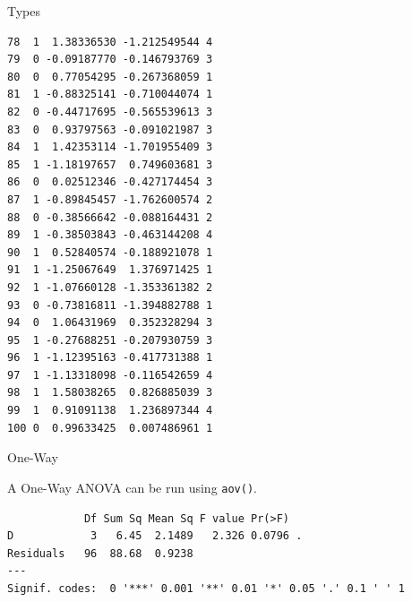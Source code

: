 \begin{frame}[fragile]{Types}
\begin{verbatim}
78  1  1.38336530 -1.212549544 4
79  0 -0.09187770 -0.146793769 3
80  0  0.77054295 -0.267368059 1
81  1 -0.88325141 -0.710044074 1
82  0 -0.44717695 -0.565539613 3
83  0  0.93797563 -0.091021987 3
84  1  1.42353114 -1.701955409 3
85  1 -1.18197657  0.749603681 3
86  0  0.02512346 -0.427174454 3
87  1 -0.89845457 -1.762600574 2
88  0 -0.38566642 -0.088164431 2
89  1 -0.38503843 -0.463144208 4
90  1  0.52840574 -0.188921078 1
91  1 -1.25067649  1.376971425 1
92  1 -1.07660128 -1.353361382 2
93  0 -0.73816811 -1.394882788 1
94  0  1.06431969  0.352328294 3
95  1 -0.27688251 -0.207930759 3
96  1 -1.12395163 -0.417731388 1
97  1 -1.13318098 -0.116542659 4
98  1  1.58038265  0.826885039 3
99  1  0.91091138  1.236897344 4
100 0  0.99633425  0.007486961 1
\end{verbatim}

\end{frame}

\begin{frame}[fragile]{One-Way}

A One-Way ANOVA can be run using \texttt{aov()}.

\begin{Shaded}
\begin{Highlighting}[]
\StringTok{ }\OperatorTok{~}\StringTok{ }
\end{Highlighting}
\end{Shaded}

\begin{verbatim}
            Df Sum Sq Mean Sq F value Pr(>F)  
D            3   6.45  2.1489   2.326 0.0796 .
Residuals   96  88.68  0.9238                 
---
Signif. codes:  0 '***' 0.001 '**' 0.01 '*' 0.05 '.' 0.1 ' ' 1
\end{verbatim}

\end{frame}

